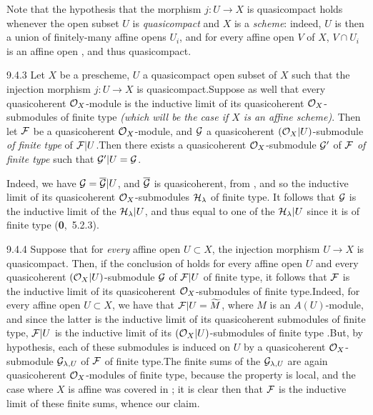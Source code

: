 Note that the hypothesis that the morphism $j\colon U\to X$ is quasicompact
holds whenever the open subset $U$ is \emph{quasicompact} and $X$ is a
\emph{scheme}: indeed, $U$ is then a union of finitely-many affine opens $U_i$,
and for every affine open $V$ of $X$, $V\cap U_i$ is an affine open , and
thus quasicompact.
 
\begin{env}[Corollary]{9.4.3}
\label{cor-1.9.4.3}
Let $X$ be a prescheme, $U$ a quasicompact open
subset of $X$ such that the injection morphism $j\colon U\to X$ is
quasicompact.Suppose as well that every quasicoherent $\mathcal{O}_X$-module is the
inductive limit of its quasicoherent $\mathcal{O}_X$-submodules of finite type
\emph{(which will be the case if $X$ is an \emph{affine scheme})}. Then let
$\mathcal{F}$ be a quasicoherent $\mathcal{O}_X$-module, and $\mathcal{G}$ a quasicoherent
$(\mathcal{O}_X|U)$-submodule \emph{of finite type} of $\mathcal{F}|U$.Then there exists
a quasicoherent $\mathcal{O}_X$-submodule $\mathcal{G}'$ of $\mathcal{F}$ \emph{of finite
type} such that $\mathcal{G}'|U=\mathcal{G}$.
\end{env}
 
Indeed, we have $\mathcal{G}=\overline{\mathcal{G}}|U$, and $\overline{\mathcal{G}}$
is quasicoherent, from , and so the inductive limit of its
quasicoherent $\mathcal{O}_X$-submodules $\mathcal{H}_\lambda$ of finite type. It
follows that $\mathcal{G}$ is the inductive limit of the $\mathcal{H}_\lambda|U$,
and thus equal to one of the $\mathcal{H}_\lambda|U$ since it is of finite type
(\textbf{0},~5.2.3).
 
\begin{envr}[Remark]{9.4.4}
\label{rmk-1.9.4.4}
Suppose that for \emph{every} affine open $U\subset X$,
the injection morphism $U\to X$ is quasicompact. Then, if the conclusion
of  holds for every affine open $U$ and every quasicoherent
$(\mathcal{O}_X|U)$-submodule $\mathcal{G}$ of $\mathcal{F}|U$ of finite type, it
follows that $\mathcal{F}$ is the inductive limit of its
quasicoherent $\mathcal{O}_X$-submodules of finite type.Indeed, for every affine open
$U\subset X$, we have that $\mathcal{F}|U=\widetilde{M}$, where $M$ is an
$A(U)$-module, and since the latter is the inductive limit of its quasicoherent
submodules of finite type, $\mathcal{F}|U$ is the inductive limit of its
$(\mathcal{O}_X|U)$-submodules of finite type .But, by hypothesis, each of
these submodules is induced on $U$ by a quasicoherent $\mathcal{O}_X$-submodule
$\mathcal{G}_{\lambda,U}$ of $\mathcal{F}$ of finite type.The finite sums of the
$\mathcal{G}_{\lambda,U}$ are again quasicoherent $\mathcal{O}_X$-modules of finite type,
because the property is local, and the case where $X$ is affine was covered in
; it is clear then that $\mathcal{F}$ is the inductive limit of these
finite sums, whence our claim.
\end{envr}
 
